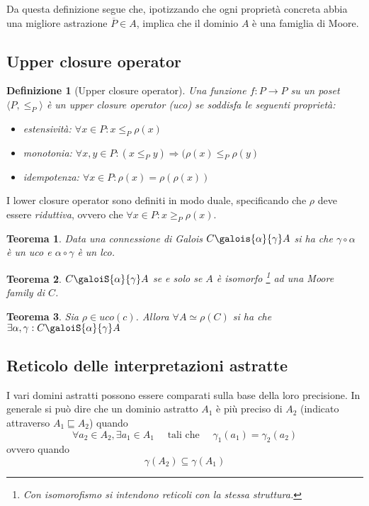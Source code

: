 \documentclass[a4paper, 10pt]{article}
\newtheorem{definit}{Definizione}[subsection]
\newtheorem{thm}{Teorema}[subsection]
\begin{document}
	Da questa definizione segue che, ipotizzando che ogni proprietà concreta abbia una migliore astrazione $\overline{P} \in A$, implica che il dominio $A$ è una famiglia di Moore.
	
	\subsection{Upper closure operator}
	\begin{definit}[Upper closure operator]
		Una funzione $f:P \to P$ su un poset $\langle P, \leq_P \rangle $ è un upper closure operator (uco) se soddisfa le seguenti proprietà:\begin{itemize}
			\item estensività: $\forall x \in P: x \leq_P \rho(x)$
			\item monotonia: $\forall x,y \in P: (x \leq_P y) \Rightarrow (\rho(x) \leq_P \rho(y)$
			\item idempotenza: $\forall x \in P: \rho(x) = \rho(\rho(x))$
		\end{itemize}
	\end{definit}

	I lower closure operator sono definiti in modo duale, specificando che $\rho$ deve essere \textit{riduttiva}, ovvero che $\forall x \in P: x \geq_P \rho(x)$.
	
	\begin{thm}
		Data una connessione di Galois $C \galois{\alpha}{\gamma} A$ si ha che $\gamma \circ \alpha$ è un uco e $\alpha \circ \gamma $ è un lco.
	\end{thm}
	\begin{thm}
		$C \galoiS{\alpha}{\gamma} A$ se e solo se $A$ è isomorfo \footnote{Con isomorofismo si intendono reticoli con la stessa struttura.} ad una Moore family di $C$.
	\end{thm}
	\begin{thm}
		Sia $\rho \in uco(c)$. Allora $\forall A \simeq \rho(C)$ si ha che $\exists \alpha, \gamma : C \galoiS{\alpha}{\gamma} A$
	\end{thm}
	
	\subsection{Reticolo delle interpretazioni astratte}
	I vari domini astratti possono essere comparati sulla base della loro precisione. In generale si può dire che un dominio astratto $A_1$ è più preciso di $A_2$ (indicato attraverso $A_1 \sqsubseteq A_2$) quando \[ \forall a_2 \in A_2, \exists a_1 \in A_1 \quad \text{ tali che } \quad \gamma_1(a_1) = \gamma_2(a_2) \] ovvero quando \[ \gamma(A_2) \subseteq \gamma(A_1) \]
	
\end{document}
